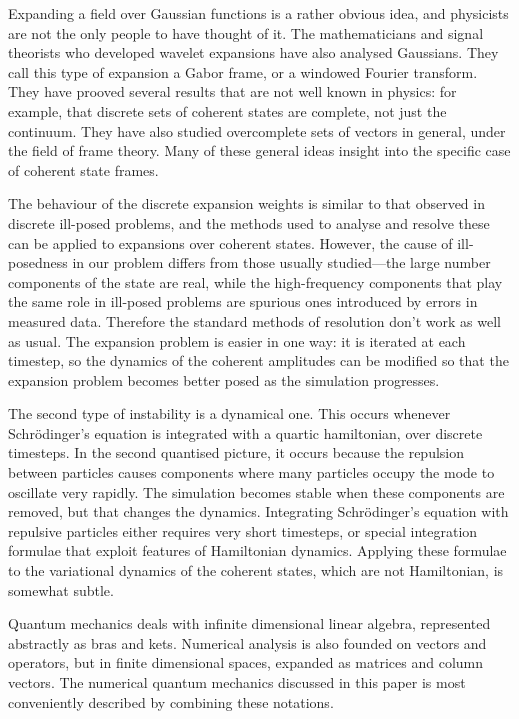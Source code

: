 Expanding a field over Gaussian functions is a rather obvious idea, and physicists are not the only people to have thought of it.  The mathematicians and signal theorists who developed wavelet expansions have also analysed Gaussians.  They call this type of expansion a Gabor frame, or a windowed Fourier transform.  They have prooved several results that are not well known in physics: for example, that discrete sets of coherent states are complete, not just the continuum.  They have also studied overcomplete sets of vectors in general, under the field of frame theory.  Many of these general ideas insight into the specific case of coherent state frames.

The behaviour of the discrete expansion weights is similar to that observed in discrete ill-posed problems, and the methods used to analyse and resolve these can be applied to expansions over coherent states.  However, the cause of ill-posedness in our problem differs from those usually studied—the large number components of the state are real, while the high-frequency components that play the same role in ill-posed problems are spurious ones introduced by errors in measured data.  Therefore the standard methods of resolution don't work as well as usual.  The expansion problem is easier in one way: it is iterated at each timestep, so the dynamics of the coherent amplitudes can be modified so that the expansion problem becomes better posed as the simulation progresses.

The second type of instability is a dynamical one.  This occurs whenever Schrödinger's equation is integrated with a quartic hamiltonian, over discrete timesteps.  In the second quantised picture, it occurs because the repulsion between particles causes components where many particles occupy the mode to oscillate very rapidly.  The simulation becomes stable when these components are removed, but that changes the dynamics.  Integrating Schrödinger's equation with repulsive particles either requires very short timesteps, or special integration formulae that exploit features of Hamiltonian dynamics.  Applying these formulae to the variational dynamics of the coherent states, which are not Hamiltonian, is somewhat subtle.



Quantum mechanics deals with infinite dimensional linear algebra, represented abstractly as bras and kets.  Numerical analysis is also founded on vectors and operators, but in finite dimensional spaces, expanded as matrices and column vectors.  The numerical quantum mechanics discussed in this paper is most conveniently described by combining these notations.

